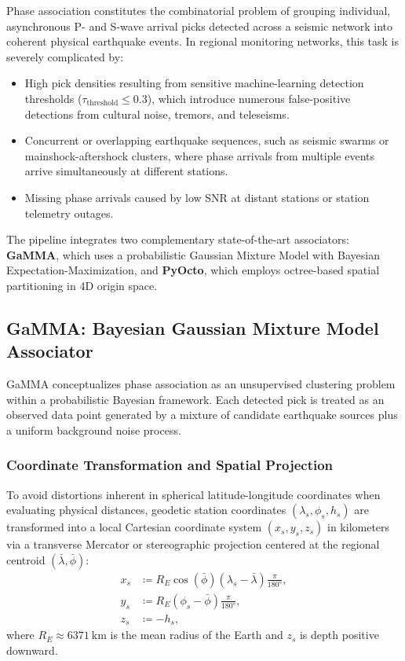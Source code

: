 Phase association constitutes the combinatorial problem of grouping
individual, asynchronous P- and S-wave arrival picks detected across
a seismic network into coherent physical earthquake events. In
regional monitoring networks, this task is severely complicated by:
\begin{itemize}
  \item High pick densities resulting from sensitive
    machine-learning detection thresholds
    ($\tau_{\mathrm{threshold}} \le \num{0.3}$), which introduce numerous
    false-positive detections from cultural noise, tremors, and teleseisms.
  \item Concurrent or overlapping earthquake sequences, such as
    seismic swarms or mainshock-aftershock clusters, where phase
    arrivals from multiple events arrive simultaneously at different stations.
  \item Missing phase arrivals caused by low \ac{SNR} at distant stations
    or station telemetry outages.
\end{itemize}

The pipeline integrates two complementary state-of-the-art
associators: \textbf{\ac{GaMMA}}, which uses a
probabilistic Gaussian Mixture Model with Bayesian
Expectation-Maximization, and \textbf{\ac{PyOcto}}, which
employs octree-based spatial partitioning in 4D origin space.

\subsection{\ac{GaMMA}: Bayesian Gaussian Mixture Model Associator}
\ac{GaMMA} conceptualizes phase association as an
unsupervised clustering problem within a probabilistic Bayesian
framework. Each detected pick is treated as an observed data point
generated by a mixture of candidate earthquake sources plus a
uniform background noise process.

\subsubsection{Coordinate Transformation and Spatial Projection}
To avoid distortions inherent in spherical latitude-longitude
coordinates when evaluating physical distances, geodetic station
coordinates $(\lambda_s, \phi_s, h_s)$ are transformed into a local
Cartesian coordinate system $(x_s, y_s, z_s)$ in kilometers via a
transverse Mercator or stereographic projection centered at the
regional centroid $(\bar{\lambda}, \bar{\phi})$:
\begin{align}
  x_s & \coloneqq R_E \cos(\bar{\phi}) (\lambda_s - \bar{\lambda})
  \frac{\pi}{\ang{180}}, \\
  y_s & \coloneqq R_E (\phi_s - \bar{\phi}) \frac{\pi}{\ang{180}}, \\
  z_s & \coloneqq - h_s,
\end{align}
where $R_E \approx \qty{6371}{\kilo\meter}$ is the mean radius of the
Earth and $z_s$ is depth positive downward.

